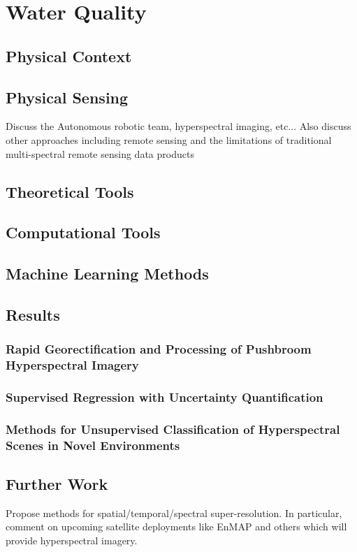 
\chapter{Water Quality}
\section{Physical Context}
\section{Physical Sensing}
Discuss the Autonomous robotic team, hyperspectral imaging, etc... Also discuss other approaches including remote sensing and the limitations of traditional multi-spectral remote sensing data products
\section{Theoretical Tools}
\section{Computational Tools}
\section{Machine Learning Methods}
\section{Results}
\subsection{Rapid Georectification and Processing of Pushbroom Hyperspectral Imagery}
\subsection{Supervised Regression with Uncertainty Quantification}
\subsection{Methods for Unsupervised Classification of Hyperspectral Scenes in Novel Environments}
\section{Further Work}
Propose methods for spatial/temporal/spectral super-resolution. In particular, comment on upcoming satellite deployments like EnMAP and others which will provide hyperspectral imagery.

